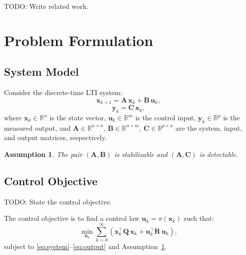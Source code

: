 \documentclass[journal]{IEEEtran}
\newtheorem{assumption}{Assumption}
\newcommand{\bx}{\bm{x}}          %
\newcommand{\bu}{\bm{u}}          %
\newcommand{\by}{\bm{y}}          %
\newcommand{\bA}{\bm{A}}          %
\newcommand{\bB}{\bm{B}}          %
\newcommand{\bC}{\bm{C}}          %
\newcommand{\bQ}{\bm{Q}}          %
\newcommand{\bR}{\bm{R}}          %
\newcommand{\R}{\mathbb{R}}        %
\newcommand{\T}{^{\top}}           %
\begin{document}
TODO: Write related work.


\section{Problem Formulation}
\label{sec:problem}

\subsection{System Model}

Consider the discrete-time LTI system:
\begin{equation}
  \bx_{k+1} = \bA\,\bx_k + \bB\,\bu_k,
  \label{eq:system}
\end{equation}
\begin{equation}
  \by_k = \bC\,\bx_k,
  \label{eq:output}
\end{equation}
where $\bx_k \in \R^n$ is the state vector, $\bu_k \in \R^m$ is the control input,
$\by_k \in \R^p$ is the measured output, and
$\bA \in \R^{n \times n}$, $\bB \in \R^{n \times m}$, $\bC \in \R^{p \times n}$
are the system, input, and output matrices, respectively.

\begin{assumption}
  \label{ass:stabilizable}
  The pair $(\bA, \bB)$ is stabilizable and $(\bA, \bC)$ is detectable.
\end{assumption}

\subsection{Control Objective}

TODO: State the control objective.

The control objective is to find a control law $\bu_k = \pi(\bx_k)$ such that:
\begin{equation}
  \min_{\bu_k} \sum_{k=0}^{\infty}
    \left( \bx_k\T \bQ\,\bx_k + \bu_k\T \bR\,\bu_k \right),
  \label{eq:objective}
\end{equation}
subject to \eqref{eq:system}--\eqref{eq:output} and Assumption~\ref{ass:stabilizable}.
\end{document}
